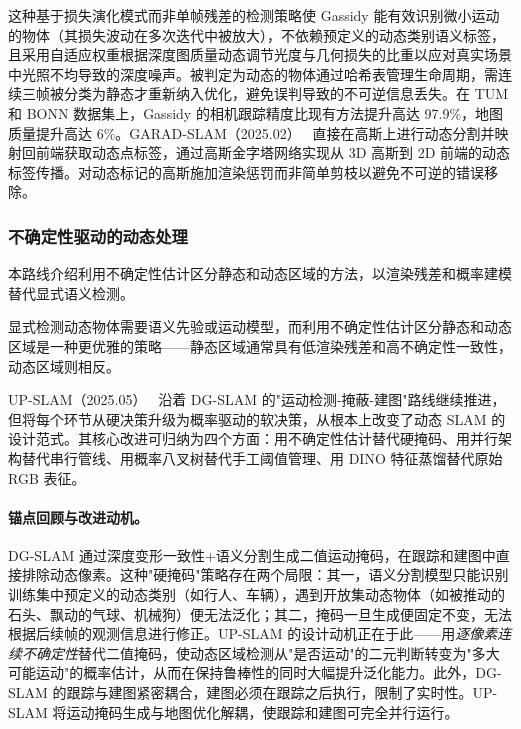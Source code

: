 这种基于损失演化模式而非单帧残差的检测策略使 Gassidy 能有效识别微小运动的物体（其损失波动在多次迭代中被放大），不依赖预定义的动态类别语义标签，且采用自适应权重根据深度图质量动态调节光度与几何损失的比重以应对真实场景中光照不均导致的深度噪声。被判定为动态的物体通过哈希表管理生命周期，需连续三帧被分类为静态才重新纳入优化，避免误判导致的不可逆信息丢失。在 TUM 和 BONN 数据集上，Gassidy 的相机跟踪精度比现有方法提升高达 97.9\%，地图质量提升高达 6\%。GARAD-SLAM（2025.02）~\cite{2502_03228} 直接在高斯上进行动态分割并映射回前端获取动态点标签，通过高斯金字塔网络实现从 3D 高斯到 2D 前端的动态标签传播。对动态标记的高斯施加渲染惩罚而非简单剪枝以避免不可逆的错误移除。

\subsubsection{不确定性驱动的动态处理}

本路线介绍利用不确定性估计区分静态和动态区域的方法，以渲染残差和概率建模替代显式语义检测。

显式检测动态物体需要语义先验或运动模型，而利用不确定性估计区分静态和动态区域是一种更优雅的策略——静态区域通常具有低渲染残差和高不确定性一致性，动态区域则相反。

UP-SLAM（2025.05）~\cite{2505_22335} 沿着 DG-SLAM 的"运动检测-掩蔽-建图"路线继续推进，但将每个环节从硬决策升级为概率驱动的软决策，从根本上改变了动态 SLAM 的设计范式。其核心改进可归纳为四个方面：用不确定性估计替代硬掩码、用并行架构替代串行管线、用概率八叉树替代手工阈值管理、用 DINO 特征蒸馏替代原始 RGB 表征。

\paragraph{锚点回顾与改进动机。}
DG-SLAM 通过深度变形一致性+语义分割生成二值运动掩码，在跟踪和建图中直接排除动态像素。这种"硬掩码"策略存在两个局限：其一，语义分割模型只能识别训练集中预定义的动态类别（如行人、车辆），遇到开放集动态物体（如被推动的石头、飘动的气球、机械狗）便无法泛化；其二，掩码一旦生成便固定不变，无法根据后续帧的观测信息进行修正。UP-SLAM 的设计动机正在于此——用\emph{逐像素连续不确定性}替代二值掩码，使动态区域检测从"是否运动"的二元判断转变为"多大可能运动"的概率估计，从而在保持鲁棒性的同时大幅提升泛化能力。此外，DG-SLAM 的跟踪与建图紧密耦合，建图必须在跟踪之后执行，限制了实时性。UP-SLAM 将运动掩码生成与地图优化解耦，使跟踪和建图可完全并行运行。

